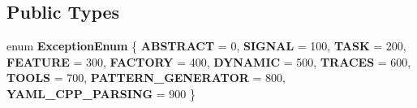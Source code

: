 \subsection*{Public Types}
\begin{DoxyCompactItemize}
\item 
\mbox{\label{classdynamic__graph_1_1ExceptionAbstract_a6c51d9c9d422045a68340908bb766ee9}} 
enum {\bfseries Exception\+Enum} \{ \newline
{\bfseries A\+B\+S\+T\+R\+A\+CT} = 0, 
{\bfseries S\+I\+G\+N\+AL} = 100, 
{\bfseries T\+A\+SK} = 200, 
{\bfseries F\+E\+A\+T\+U\+RE} = 300, 
\newline
{\bfseries F\+A\+C\+T\+O\+RY} = 400, 
{\bfseries D\+Y\+N\+A\+M\+IC} = 500, 
{\bfseries T\+R\+A\+C\+ES} = 600, 
{\bfseries T\+O\+O\+LS} = 700, 
\newline
{\bfseries P\+A\+T\+T\+E\+R\+N\+\_\+\+G\+E\+N\+E\+R\+A\+T\+OR} = 800, 
{\bfseries Y\+A\+M\+L\+\_\+\+C\+P\+P\+\_\+\+P\+A\+R\+S\+I\+NG} = 900
 \}
\end{DoxyCompactItemize}
